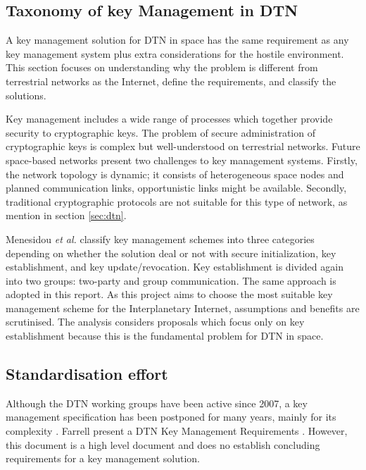 \subsection{Taxonomy of key Management in DTN}

A key management solution for DTN in space has the same requirement as any key management system plus extra considerations for the hostile environment. This section focuses on understanding why the problem is different from terrestrial networks as the Internet, define the requirements, and classify the solutions. 



Key management includes a wide range of processes which together provide security to cryptographic keys.  The problem of secure administration of cryptographic keys is complex but well-understood on terrestrial networks. Future space-based networks present two challenges to key management systems. Firstly, the network topology is dynamic; it consists of heterogeneous space nodes and planned communication links, opportunistic links might be available. Secondly, traditional cryptographic protocols are not suitable for this type of network, as mention in section \ref{sec:dtn}.

Menesidou \textit{et al.} \cite{menesidou2017cryptographic} classify key management schemes into three categories depending on whether the solution deal or not with secure initialization, key establishment, and key update/revocation. Key establishment is divided again into two groups: two-party and group communication. The same approach is adopted in this report. As this project aims to choose the most suitable key management scheme for the Interplanetary Internet, assumptions and benefits are scrutinised. The analysis considers proposals which focus only on key establishment because this is the fundamental problem for DTN in space.

\subsection{Standardisation effort}

Although the DTN working groups have been active since 2007, a key management specification has been postponed for many years, mainly for its complexity \cite{rfc6257}. Farrell present a DTN Key Management Requirements \cite{farrell-dtnrg-km-00}. However, this document is a high level document and does no establish concluding requirements for a key management solution. 


